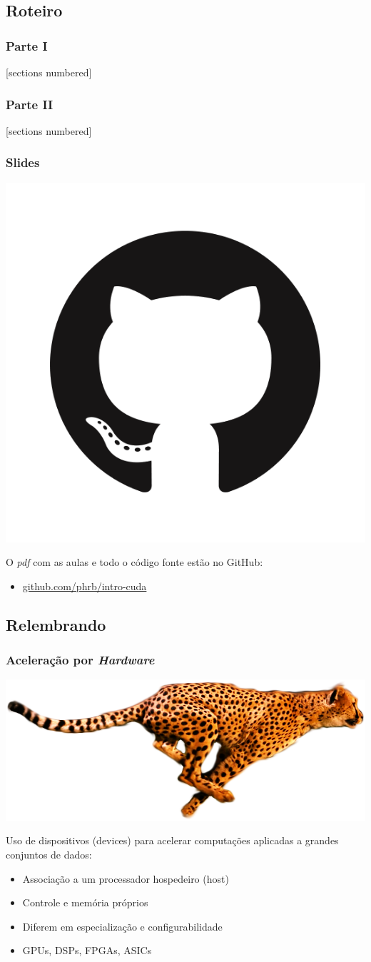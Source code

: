 \documentclass[10pt, compress]{beamer}
\begin{document}
\subsection{Roteiro}

\begin{frame}
    \frametitle{Parte I}
    [sections numbered]
    \tableofcontents[hideallsubsections, part=1]
\end{frame}

\begin{frame}
    \frametitle{Parte II}
    [sections numbered]
    \tableofcontents[hideallsubsections, part=2]
\end{frame}

\begin{frame}
    \frametitle{Slides}
    \begin{center}
        \includegraphics[width=.18\textwidth]{github}
    \end{center}
    O \emph{pdf} com as aulas e todo o código fonte estão no \alert{GitHub}:

    \begin{itemize}
        \item \url{github.com/phrb/intro-cuda}
    \end{itemize}
\end{frame}

\subsection{Relembrando}

\begin{frame}
    \frametitle{Aceleração por \textit{Hardware}}
    \begin{center}
        \includegraphics[width=.6\textwidth]{accelerate}
    \end{center}

    Uso de \alert{dispositivos} (devices) para acelerar computações aplicadas a
    grandes conjuntos de dados:

    \begin{itemize}
        \item Associação a um processador \alert{hospedeiro} (host)
        \item Controle e memória próprios
        \item Diferem em especialização e configurabilidade
        \item \alert{GPUs}, DSPs, FPGAs, ASICs
    \end{itemize}
\end{frame}
\end{document}
